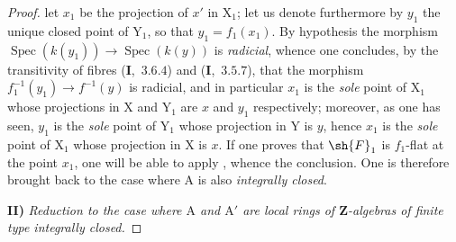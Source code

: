\begin{proof}
let $x_1$ be the projection of $x'$ in $\mathrm{X}_1$; let us denote furthermore by $y_1$ the unique closed point
of $\mathrm{Y}_1$, so that $y_1=f_1(x_1)$. By hypothesis the morphism $\operatorname{Spec}(k(y_1))\to\operatorname{Spec}(k(y))$
is \emph{radicial}, whence one concludes, by the transitivity of fibres (\textbf{I},~$3.6.4$) and (\textbf{I},~$3.5.7$), that
the morphism $f_1^{-1}(y_1)\to f^{-1}(y)$ is radicial, and in particular $x_1$ is the \emph{sole} point of $\mathrm{X}_1$
whose projections in $\mathrm{X}$ and $\mathrm{Y}_1$ are $x$ and $y_1$ respectively; moreover, as one has seen, $y_1$
is the \emph{sole} point of $\mathrm{Y}_1$ whose projection in $\mathrm{Y}$ is $y$, hence $x_1$ is the \emph{sole} point of $\mathrm{X}_1$
whose projection in $\mathrm{X}$ is $x$. If one proves that $\sh{F}_1$ is $f_1$-flat at the point $x_1$, one will be able to
apply , whence the conclusion. One is therefore brought back to the case where $\mathrm{A}$
is also \emph{integrally closed}.

\medskip
\noindent\textbf{II)} \emph{Reduction to the case where $\mathrm{A}$ and $\mathrm{A}'$ are local rings of $\mathbf{Z}$-algebras of finite type integrally
closed.}


\end{proof}
